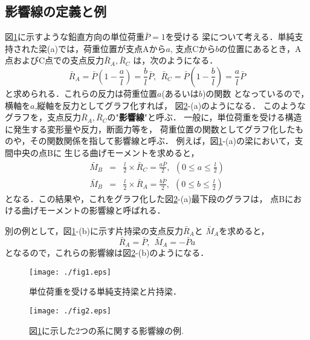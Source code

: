 \documentclass[10pt,a4j]{jarticle}
\begin{document}
\subsection{影響線の定義と例}
図\ref{fig:fig13_1}に示すような鉛直方向の単位荷重$\bar P=1$を受ける
梁について考える．単純支持された梁(a)では，荷重位置が支点Aから$a$,
支点Cから$b$の位置にあるとき，A点およびC点での支点反力$\bar{R}_A,\bar{R}_C$
は，次のようになる．
\begin{equation}
	\bar R_A =  \bar{P}\left( 1-\frac{a}{l}\right)
	=
	\frac{b}{l}
	\bar{P}
	, \ \ 
	\bar R_C =  \bar{P}\left( 1-\frac{b}{l}\right)
	= \frac{a}{l} \bar{P}
	\label{eqn:Rbar_1}
\end{equation}
と求められる．これらの反力は荷重位置$a$(あるいは$b$)の関数
となっているので，横軸を$a$,縦軸を反力としてグラフ化すれば，
図\ref{fig:fig13_2}-(a)のようになる．
このようなグラフを，支点反力$\bar{R}_A,\bar{R}_C$の"{\bf 影響線}"と呼ぶ．
一般に，単位荷重を受ける構造に発生する変形量や反力，断面力等を，
荷重位置の関数としてグラフ化したものや，その関数関係を指して影響線と呼ぶ．
例えば，図\ref{fig:fig13_1}-(a)の梁において，支間中央の点Bに
生じる曲げモーメントを求めると，
\begin{eqnarray}
	\bar{M}_B &=& \frac{l}{2}\times \bar{R}_C=\frac{a\bar P }{2}
	, \ \ \left( 0 \leq a \leq \frac{l}{2} \right) \\
	\bar{M}_B &=& \frac{l}{2}\times \bar{R}_A=\frac{b\bar P }{2}
	, \ \ \left( 0 \leq b \leq \frac{l}{2} \right) 
\end{eqnarray}
となる．この結果や，これをグラフ化した図\ref{fig:fig13_2}-(a)最下段のグラフは，
点Bにおける曲げモーメントの影響線と呼ばれる．

別の例として，図\ref{fig:fig13_1}-(b)に示す片持梁の支点反力$\bar R_A$と
$\bar M_A$を求めると，
\begin{equation}
	\bar{R}_A=\bar{P}, \ \ 
	\bar{M}_A=-\bar{P} a
	\label{eqn:Mbar_2}
\end{equation}
となるので，これらの影響線は図\ref{fig:fig13_2}-(b)のようになる．
\begin{figure}[h]
	\begin{center}
	\texttt{[image: ./fig1.eps]} 
	\end{center}
	\caption{
		単位荷重を受ける単純支持梁と片持梁．
	} 
	\label{fig:fig13_1}
\end{figure}
\begin{figure}[h]
	\begin{center}
	\texttt{[image: ./fig2.eps]} 
	\end{center}
	\caption{
		図\ref{fig:fig13_1}に示した2つの系に関する影響線の例.
	} 
	\label{fig:fig13_2}
\end{figure}
\end{document}
